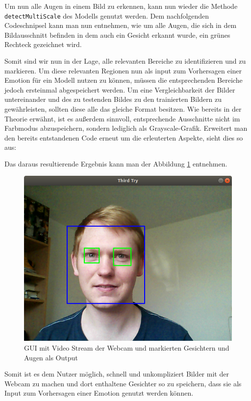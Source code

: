 \documentclass[12pt, a4paper]{scrbook}
\begin{document}
Um nun alle Augen in einem Bild zu erkennen, kann nun wieder die Methode \texttt{detectMultiScale} des Modells genutzt werden. Dem nachfolgenden Codeschnipsel kann man nun entnehmen, wie um alle Augen, die sich in dem Bildausschnitt befinden in dem auch ein Gesicht erkannt wurde, ein grünes Rechteck gezeichnet wird.

Somit sind wir nun in der Lage, alle relevanten Bereiche zu identifizieren und zu markieren. Um diese relevanten Regionen nun als input zum Vorhersagen einer Emotion für ein Modell nutzen zu können, müssen die entsprechenden Bereiche jedoch ersteinmal abgespeichert werden. Um eine Vergleichbarkeit der Bilder untereinander und des zu testenden Bildes zu den trainierten Bildern zu gewährleisten, sollten diese alle das gleiche Format besitzen. Wie bereits in der Theorie erwähnt, ist es außerdem sinnvoll, entsprechende Ausschnitte nicht im Farbmodus abzuspeichern, sondern lediglich als Grayscale-Grafik. Erweitert man den bereits entstandenen Code erneut um die erleuterten Aspekte, sieht dies so aus:

Das daraus resultierende Ergebnis kann man der Abbildung \ref{fig:Input GUI 3} entnehmen.
\begin{figure}[h]
\includegraphics[width=\linewidth]{Bilder/InputGUI3.png}
\caption{GUI mit Video Stream der Webcam und markierten Gesichtern und Augen als Output}
\label{fig:Input GUI 3}
\end{figure}
Somit ist es dem Nutzer möglich, schnell und unkompliziert Bilder mit der Webcam zu machen und dort enthaltene Gesichter so zu speichern, dass sie als Input zum Vorhersagen einer Emotion genutzt werden können.
\end{document}
